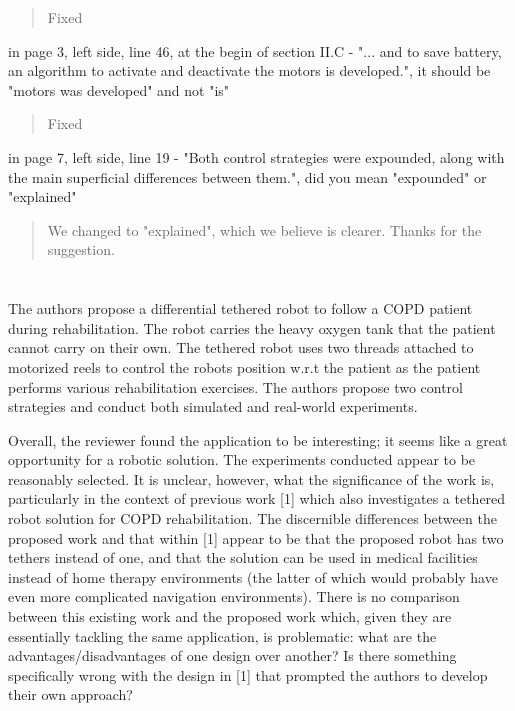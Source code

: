 \documentclass[journal,onecolumn,12pt]{IEEEtran}
\begin{document}
 \begin{quotation}
{\color{blue}
Fixed
}
\end{quotation}     
      
      in page 3, left side, line 46, at the begin of section II.C - "... and to save battery, an algorithm to activate and deactivate the motors is developed.", it should be "motors was developed" and not "is"

\begin{quotation}
{\color{blue}
Fixed
}
\end{quotation}

      in page 7, left side, line 19 - "Both control strategies were expounded, along with the main superficial differences between them.", did you mean "expounded" or "explained"
      
      
      \begin{quotation}
{\color{blue}
We changed to "explained", which we believe is clearer.  Thanks for the suggestion.
}
\end{quotation}

\section*{}

The authors propose a differential tethered robot to follow a COPD patient during rehabilitation. The robot carries the heavy oxygen tank that the patient cannot carry on their own. The tethered robot uses two threads attached to motorized reels to control the robots position w.r.t the patient as the patient performs various rehabilitation exercises. The authors propose two control strategies and conduct both simulated and real-world experiments.

\vspace{2em}

Overall, the reviewer found the application to be interesting; it seems like a great opportunity for a robotic solution. The experiments conducted appear to be reasonably selected. It is unclear, however, what the significance of the work is, particularly in the context of previous work [1] which also investigates a tethered robot solution for COPD rehabilitation. The discernible differences between the proposed work and that within [1] appear to be that the proposed robot has two tethers instead of one, and that the solution can be used in medical facilities instead of home therapy environments (the latter of which would probably have even more complicated navigation environments). There is no comparison between this existing work and the proposed work which, given they are essentially tackling the same application, is problematic: what are the advantages/disadvantages of one design over another? Is there something specifically wrong with the design in [1] that prompted the authors to develop their own approach?
\end{document}
